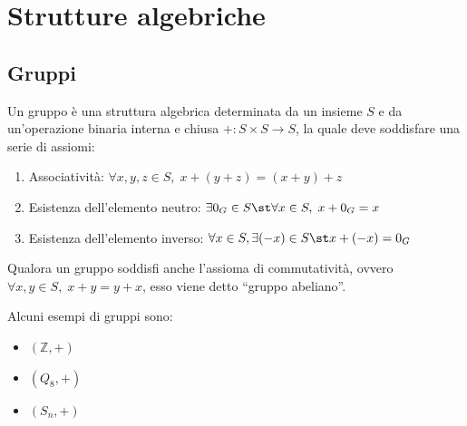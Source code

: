 
\section{Strutture algebriche} \label{sec:algstructures}

\subsection{Gruppi} \label{subsec:groups}
    Un gruppo è una struttura algebrica determinata da un insieme $S$ e da un'operazione binaria interna e chiusa $+ : S \times S \rightarrow S$, la quale deve soddisfare una serie
    di assiomi:
    \begin{enumerate}[label=(\arabic*)]
        \item Associatività: $\forall x, y, z \in S, \; x + (y + z) = (x + y) + z$
        \item Esistenza dell'elemento neutro: $\exists 0_G \in S \st \forall x \in S, \; x + 0_G = x$
        \item Esistenza dell'elemento inverso: $\forall x \in S, \exists (-x) \in S \st x + (-x) = 0_G$
    \end{enumerate}
    Qualora un gruppo soddisfi anche l'assioma di commutatività, ovvero $\forall x, y \in S, \; x + y = y + x$, esso viene detto ``gruppo abeliano''.

    \vspace{10pt}
    Alcuni esempi di gruppi sono:
    \begin{itemize}
        \item $(\mathbb{Z}, +)$
        \item $(Q_8, +)$
        \item $(S_n, +)$
    \end{itemize}




